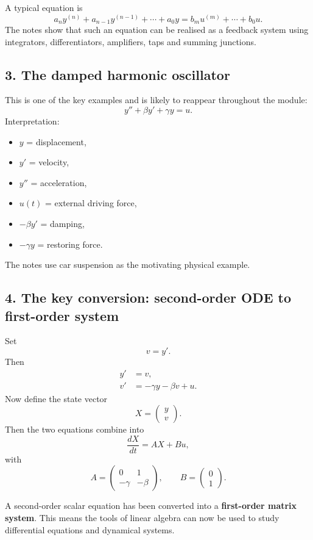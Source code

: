 \documentclass[11pt,a4paper]{article}
\begin{document}
A typical equation is
\[
a_n y^{(n)}+a_{n-1}y^{(n-1)}+\cdots+a_0y
=
 b_m u^{(m)}+\cdots+b_0u.
\]
The notes show that such an equation can be realised as a feedback system using integrators, differentiators, amplifiers, taps and summing junctions.

\subsection*{3. The damped harmonic oscillator}
This is one of the key examples and is likely to reappear throughout the module:
\[
\boxed{y''+\beta y'+\gamma y=u.}
\]
Interpretation:
\begin{itemize}[leftmargin=1.5em]
\item $y$ = displacement,
\item $y'$ = velocity,
\item $y''$ = acceleration,
\item $u(t)$ = external driving force,
\item $-\beta y'$ = damping,
\item $-\gamma y$ = restoring force.
\end{itemize}
The notes use car suspension as the motivating physical example.

\subsection*{4. The key conversion: second-order ODE to first-order system}
Set
\[
v=y'.
\]
Then
\[
\begin{aligned}
y'&=v,\\
v'&=-\gamma y-\beta v+u.
\end{aligned}
\]
Now define the state vector
\[
X=\begin{pmatrix}y\\v\end{pmatrix}.
\]
Then the two equations combine into
\[
\boxed{\frac{dX}{dt}=AX+Bu},
\]
with
\[
A=\begin{pmatrix}
0&1\\
-\gamma&-\beta
\end{pmatrix},
\qquad
B=\begin{pmatrix}0\\1\end{pmatrix}.
\]

\begin{keybox}
A second-order scalar equation has been converted into a \textbf{first-order matrix system}. This means the tools of linear algebra can now be used to study differential equations and dynamical systems.
\end{keybox}
\end{document}
